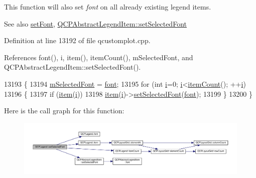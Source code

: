 This function will also set {\itshape font} on all already existing legend items.

\begin{DoxySeeAlso}{See also}
\hyperlink{class_q_c_p_legend_aa4cda8499e3cb0f3be415edc02984c73}{set\+Font}, \hyperlink{class_q_c_p_abstract_legend_item_a91db5aee48617a9d3206e61376807365}{Q\+C\+P\+Abstract\+Legend\+Item\+::set\+Selected\+Font} 
\end{DoxySeeAlso}


Definition at line 13192 of file qcustomplot.\+cpp.



References font(), i, item(), item\+Count(), m\+Selected\+Font, and Q\+C\+P\+Abstract\+Legend\+Item\+::set\+Selected\+Font().


\begin{DoxyCode}
13193 \{
13194   \hyperlink{class_q_c_p_legend_a86ce8f6c20a2f51a48eaf3c24ce16805}{mSelectedFont} = \hyperlink{class_q_c_p_legend_a5cf8b840bc02f7bf4edb8dde400d0f41}{font};
13195   \textcolor{keywordflow}{for} (\textcolor{keywordtype}{int} \hyperlink{_comparision_pictures_2_createtest_image_8m_a6f6ccfcf58b31cb6412107d9d5281426}{i}=0; \hyperlink{_comparision_pictures_2_createtest_image_8m_a6f6ccfcf58b31cb6412107d9d5281426}{i}<\hyperlink{class_q_c_p_legend_a198228e9cdc78d3a3c306fa6763d0404}{itemCount}(); ++\hyperlink{_comparision_pictures_2_createtest_image_8m_a6f6ccfcf58b31cb6412107d9d5281426}{i})
13196   \{
13197     \textcolor{keywordflow}{if} (\hyperlink{class_q_c_p_legend_a454272d7094437beb3278a2294006da5}{item}(\hyperlink{_comparision_pictures_2_createtest_image_8m_a6f6ccfcf58b31cb6412107d9d5281426}{i}))
13198       \hyperlink{class_q_c_p_legend_a454272d7094437beb3278a2294006da5}{item}(\hyperlink{_comparision_pictures_2_createtest_image_8m_a6f6ccfcf58b31cb6412107d9d5281426}{i})->\hyperlink{class_q_c_p_abstract_legend_item_a91db5aee48617a9d3206e61376807365}{setSelectedFont}(\hyperlink{class_q_c_p_legend_a5cf8b840bc02f7bf4edb8dde400d0f41}{font});
13199   \}
13200 \}
\end{DoxyCode}


Here is the call graph for this function\+:\nopagebreak
\begin{figure}[H]
\begin{center}
\leavevmode
\includegraphics[width=350pt]{class_q_c_p_legend_ab580a01c3c0a239374ed66c29edf5ad2_cgraph}
\end{center}
\end{figure}


